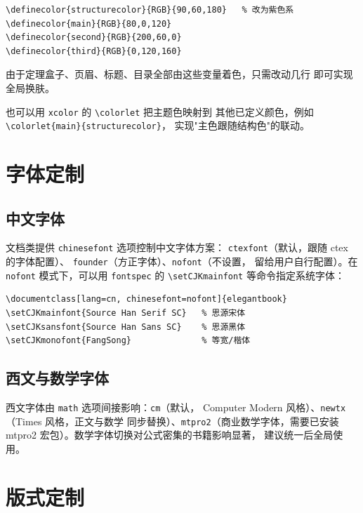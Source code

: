 \begin{lstlisting}
\definecolor{structurecolor}{RGB}{90,60,180}   % 改为紫色系
\definecolor{main}{RGB}{80,0,120}
\definecolor{second}{RGB}{200,60,0}
\definecolor{third}{RGB}{0,120,160}
\end{lstlisting}

由于定理盒子、页眉、标题、目录全部由这些变量着色，只需改动几行
即可实现全局换肤。

\begin{remark}
也可以用 \texttt{xcolor} 的 \verb|\colorlet| 把主题色映射到
其他已定义颜色，例如 \verb|\colorlet{main}{structurecolor}|，
实现"主色跟随结构色"的联动。
\end{remark}

\section{字体定制}

\subsection{中文字体}

文档类提供 \texttt{chinesefont} 选项控制中文字体方案：
\texttt{ctexfont}（默认，跟随 ctex 的字体配置）、
\texttt{founder}（方正字体）、\texttt{nofont}（不设置，
留给用户自行配置）。在 \texttt{nofont} 模式下，可以用
\texttt{fontspec} 的 \verb|\setCJKmainfont| 等命令指定系统字体：

\begin{lstlisting}
\documentclass[lang=cn, chinesefont=nofont]{elegantbook}
\setCJKmainfont{Source Han Serif SC}   % 思源宋体
\setCJKsansfont{Source Han Sans SC}    % 思源黑体
\setCJKmonofont{FangSong}              % 等宽/楷体
\end{lstlisting}

\subsection{西文与数学字体}

西文字体由 \texttt{math} 选项间接影响：\texttt{cm}（默认，
Computer Modern 风格）、\texttt{newtx}（Times 风格，正文与数学
同步替换）、\texttt{mtpro2}（商业数学字体，需要已安装
mtpro2 宏包）。数学字体切换对公式密集的书籍影响显著，
建议统一后全局使用。

\section{版式定制}

